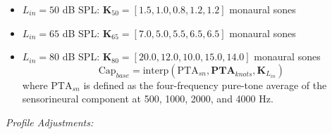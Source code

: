 \documentclass[
  12pt,
]{article}
\providecommand{\tightlist}{%
  \setlength{\itemsep}{0pt}\setlength{\parskip}{0pt}}
\begin{document}
\begin{enumerate}
  \begin{itemize}
  \tightlist
  \item
    \(L_{in} = 50\) dB SPL:
    \(\mathbf{K}_{50} = [1.5, 1.0, 0.8, 1.2, 1.2]\) monaural sones
  \item
    \(L_{in} = 65\) dB SPL:
    \(\mathbf{K}_{65} = [7.0, 5.0, 5.5, 6.5, 6.5]\) monaural sones
  \item
    \(L_{in} = 80\) dB SPL:
    \(\mathbf{K}_{80} = [20.0, 12.0, 10.0, 15.0, 14.0]\) monaural sones
    \begin{equation}
    \text{Cap}_{base} = \text{interp}\left(\text{PTA}_{sn}, \mathbf{PTA}_{knots}, \mathbf{K}_{L_{in}}\right)
    \end{equation} where \(\text{PTA}_{sn}\) is defined as the
    four-frequency pure-tone average of the sensorineural component at
    500, 1000, 2000, and 4000 Hz.
  \end{itemize}

  \emph{Profile Adjustments:}


\end{enumerate}
\end{document}
